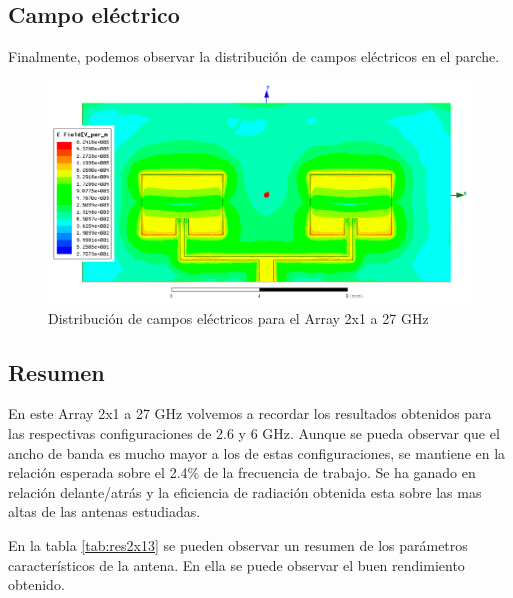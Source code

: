 \newpage
\subsection{Campo eléctrico}
\par Finalmente, podemos observar la distribución de campos eléctricos en el parche. 
\begin{figure}[H]
    \centering
        \includegraphics[width=\textwidth]{archivos/analisis/2x13/8}
        \caption{Distribución de campos eléctricos para el Array 2x1 a 27 GHz}
        \label{fig:elec2x13}
\end{figure}


\subsection{Resumen}
\par En este Array 2x1 a 27 GHz volvemos a recordar los resultados obtenidos para las respectivas configuraciones de 2.6 y 6 GHz. Aunque se pueda observar que el ancho de banda es mucho mayor a los de estas configuraciones, se mantiene en la relación esperada sobre el 2.4\% de la frecuencia de trabajo. Se ha ganado en relación delante/atrás y la eficiencia de radiación obtenida esta sobre las mas altas de las antenas estudiadas. 
\\
\par En la tabla \ref{tab:res2x13} se pueden observar un resumen de los parámetros característicos de la antena. En ella se puede observar el buen rendimiento obtenido.

